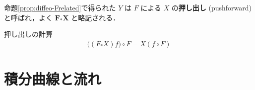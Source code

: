 \documentclass[TQFT_main]{subfiles}
\begin{document}
\begin{marker}
    命題\ref{prop:diffeo-Frelated}で得られた $Y$ は $F$ による $X$ の\textbf{押し出し} (pushforward) と呼ばれ，よく $\bm{F_* X}$ と略記される．
\end{marker}


\begin{mycol}[label=col:pushforward]{押し出しの計算}
    \begin{align}
        \bigl( (F_* X) f \bigr) \circ F = X(f \circ F)
    \end{align}
\end{mycol}

\section{積分曲線と流れ}
\end{document}
